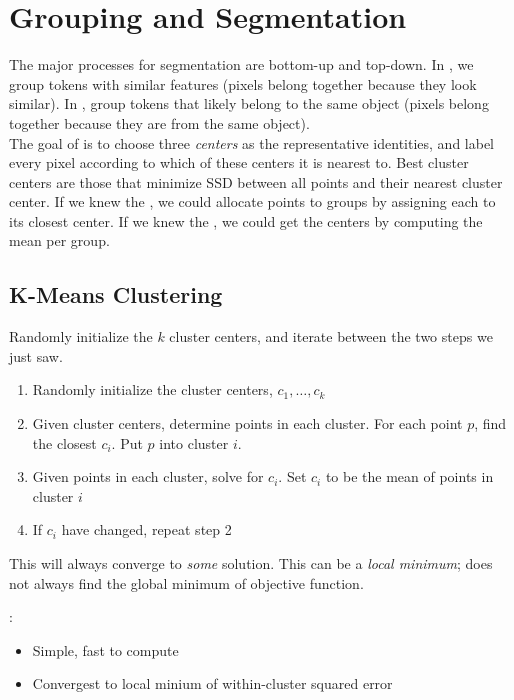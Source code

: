 \documentclass{article}
\begin{document}

\section{Grouping and Segmentation}

The major processes for segmentation are bottom-up and top-down. In , we group tokens with similar features (pixels belong together because they look similar). In , group tokens that likely belong to the same object (pixels belong together because they are from the same object). \\ 

The goal of  is to choose three \emph{centers} as the representative identities, and label every pixel according to which of these centers it is nearest to. Best cluster centers are those that minimize SSD between all points and their nearest cluster center. If we knew the , we could allocate points to groups by assigning each to its closest center. If we knew the , we could get the centers by computing the mean per group.  

\subsection{K-Means Clustering}

\begin{definition}
  Randomly initialize the $k$ cluster centers, and iterate between the two steps we just saw. 
  \begin{enumerate}
    \item Randomly initialize the cluster centers, $c_1 , \dots , c_k$ 
    \item Given cluster centers, determine points in each cluster. For each point $p$, find the closest $c_i$. Put $p$ into cluster $i$. 
    \item Given points in each cluster, solve for $c_i$. Set $c_i$ to be the mean of points in cluster $i$ 
    \item If $c_i$ have changed, repeat step 2 
  \end{enumerate}
  This will always converge to \emph{some} solution. This can be a \emph{local minimum}; does not always find the global minimum of objective function. 
\end{definition}

: 
\begin{itemize}
  \item Simple, fast to compute 
  \item Convergest to local minium of within-cluster squared error
\end{itemize}
\end{document}
